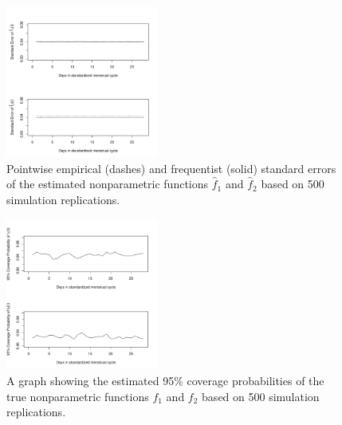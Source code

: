 \documentclass[12pt, notitlepage]{article}
\begin{document}
\begin{figure} 
\centering
\includegraphics[width=50mm]{bivNOU_liu_SEf.pdf}
\caption{Pointwise empirical (dashes) and frequentist (solid) standard errors of the estimated nonparametric functions $\hat f_1$ and $\hat f_2$ based on 500 simulation replications.}
\label{standarderror}
\end{figure}


\begin{figure}
\centering
\includegraphics[width=50mm]{bivNOU_liu_cp.pdf}
\caption{A graph showing the estimated 95\% coverage probabilities of the true nonparametric functions $f_1$ and $f_2$ based on 500 simulation replications.}
\label{coverage}
\end{figure}
\end{document}

